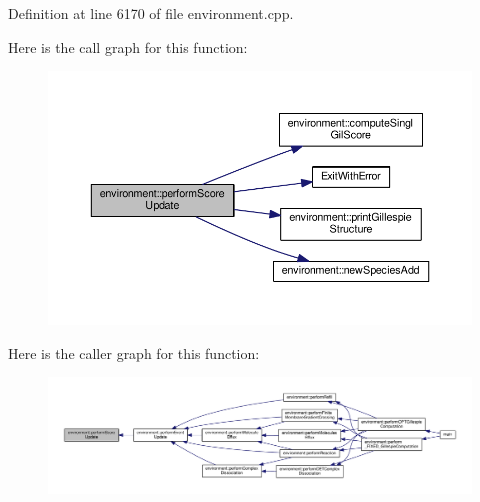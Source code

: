 Definition at line 6170 of file environment.\-cpp.



Here is the call graph for this function\-:\nopagebreak
\begin{figure}[H]
\begin{center}
\leavevmode
\includegraphics[width=350pt]{a00011_ad25f6aa3ab2ac6097f57828bcf78e5c9_cgraph}
\end{center}
\end{figure}




Here is the caller graph for this function\-:\nopagebreak
\begin{figure}[H]
\begin{center}
\leavevmode
\includegraphics[width=350pt]{a00011_ad25f6aa3ab2ac6097f57828bcf78e5c9_icgraph}
\end{center}
\end{figure}



